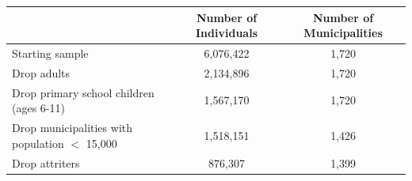 \begin{tabular}{l c c}
\hline\hline
 & Number of Individuals & Number of Municipalities \\
\hline
Starting sample &    6,076,422 &        1,720 \\
Drop adults &    2,134,896 &        1,720 \\
Drop primary school children (ages 6-11) &    1,567,170 &        1,720 \\
Drop municipalities with population $<$ 15,000 &    1,518,151 &        1,426 \\
Drop attriters &      876,307 &        1,399 \\
\hline\hline
\end{tabular}
